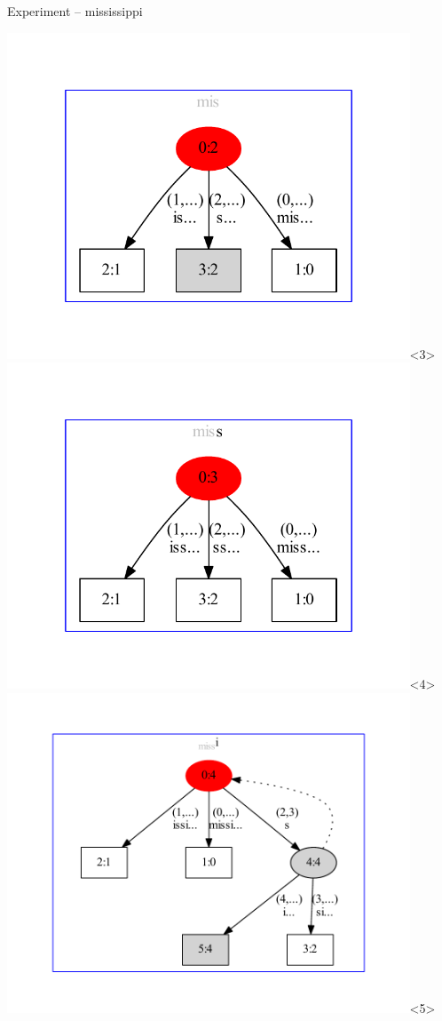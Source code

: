\begin{frame}[shrink=13]{Experiment -- mississippi}
\begin{overlayarea}{\textwidth}{\textheight}
\includegraphics[keepaspectratio,trim=40pt 40pt 40pt 40pt,height=0.8\textheight,width=0.9\textwidth]{mis.pdf}<3>
\includegraphics[keepaspectratio,trim=40pt 40pt 40pt 40pt,height=0.8\textheight,width=0.9\textwidth]{miss.pdf}<4>
\includegraphics[keepaspectratio,trim=40pt 40pt 40pt 40pt,height=0.8\textheight,width=0.9\textwidth]{missi.pdf}<5>

\end{overlayarea}
\end{frame}
